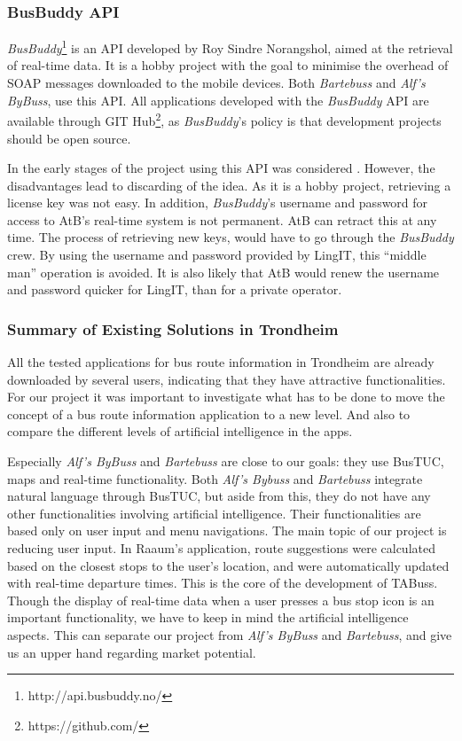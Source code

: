 \subsubsection{BusBuddy API}
\emph{BusBuddy}\footnote{http://api.busbuddy.no/} is an API developed by Roy Sindre Norangshol, aimed at the retrieval of real-time data. It is a hobby project with the goal to minimise the overhead of SOAP messages downloaded to the mobile devices. Both \emph{Bartebuss} and \emph{Alf's ByBuss}, use this API. All applications developed with the \emph{BusBuddy} API are available through GIT Hub\footnote{https://github.com/}, as \emph{BusBuddy}'s policy is that development projects should be open source. 

In the early stages of the project using this API was considered . However, the disadvantages lead to discarding of the idea. As it is a hobby project, retrieving a license key was not easy. In addition, \emph{BusBuddy}'s username and password for access to AtB's real-time system is not permanent. AtB can retract this at any time. The process of retrieving new keys, would have to go through the \emph{BusBuddy} crew. By using the username and password provided by LingIT, this ``middle man'' operation is avoided. It is also likely that AtB would renew the username and password quicker for LingIT, than for a private operator.

\subsubsection{Summary of Existing Solutions in Trondheim}
All the tested applications for bus route information in Trondheim are already downloaded by several users, indicating that they have attractive functionalities. For our project it was important to investigate what has to be done to move the concept of a bus route information application to a new level. And also to compare the different levels of artificial intelligence in the apps. 

Especially \emph{Alf's ByBuss} and \emph{Bartebuss} are close to our goals: they use BusTUC, maps and real-time functionality. Both \emph{Alf's Bybuss} and \emph{Bartebuss} integrate natural language through BusTUC, but aside from this, they do not have any other functionalities involving artificial intelligence. Their functionalities are based only on user input and menu navigations. The main topic of our project is reducing user input. In Raaum's application, route suggestions were calculated based on the closest stops to the user's location, and were automatically updated with real-time departure times. This is the core of the development of TABuss. Though the display of real-time data when a user presses a bus stop icon is an important functionality, we have to keep in mind the artificial intelligence aspects. This can separate our project from \emph{Alf's ByBuss} and \emph{Bartebuss}, and give us an upper hand regarding market potential.

